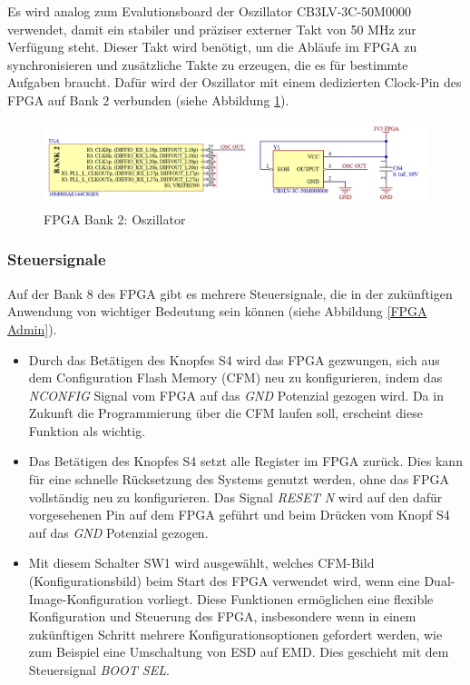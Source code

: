 Es wird analog zum Evalutionsboard der Oszillator CB3LV-3C-50M0000 verwendet, damit ein stabiler und präziser externer Takt von 50 MHz zur Verfügung steht. Dieser Takt wird benötigt, um die Abläufe im FPGA zu synchronisieren und zusätzliche Takte zu erzeugen, die es für bestimmte Aufgaben braucht. Dafür wird der Oszillator mit einem dedizierten Clock-Pin des FPGA auf Bank 2 verbunden (siehe Abbildung \ref{FPGA OSC}).

\begin{figure}[H]
    \centering
    \includegraphics[width=1.0\linewidth]{Figures/Chap3/Schematics/Bank2_OSC.png}
    \caption{FPGA Bank 2: Oszillator}
    \label{FPGA OSC}
\end{figure}

\subsubsection{Steuersignale}
\label{subsec:Steuersignale}

Auf der Bank 8 des FPGA gibt es mehrere Steuersignale, die in der zukünftigen Anwendung von wichtiger Bedeutung sein können (siehe Abbildung \ref{FPGA Admin}).

\begin{itemize}
    \item Durch das Betätigen des Knopfes S4 wird das FPGA gezwungen, sich aus dem Configuration Flash Memory (CFM) neu zu konfigurieren, indem das \textit{NCONFIG} Signal vom FPGA auf das \textit{GND} Potenzial gezogen wird. Da in Zukunft die Programmierung über die CFM laufen soll, erscheint diese Funktion als wichtig.
    
    \item Das Betätigen des Knopfes S4 setzt alle Register im FPGA zurück. Dies kann für eine schnelle Rücksetzung des Systems genutzt werden, ohne das FPGA vollständig neu zu konfigurieren. Das Signal \textit{RESET N} wird auf den dafür vorgesehenen Pin auf dem FPGA geführt und beim Drücken vom Knopf S4 auf das \textit{GND} Potenzial gezogen.
    
    \item Mit diesem Schalter SW1 wird ausgewählt, welches CFM-Bild (Konfigurationsbild) beim Start des FPGA verwendet wird, wenn eine Dual-Image-Konfiguration vorliegt. Diese Funktionen ermöglichen eine flexible Konfiguration und Steuerung des FPGA, insbesondere wenn in einem zukünftigen Schritt mehrere Konfigurationsoptionen gefordert werden, wie zum Beispiel eine Umschaltung von ESD auf EMD. Dies geschieht mit dem Steuersignal \textit{BOOT SEL}.
\end{itemize}

